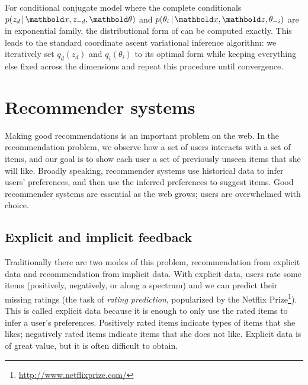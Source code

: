 For conditional conjugate model where the complete conditionals $p(z_d \g \mbx, z_{-d}, \mb\theta)$ and $p(\theta_i \g \mbx, \mbz, \theta_{-i})$ are in exponential family, the distributional form of  can be computed exactly. This leads to the standard coordinate ascent variational inference algorithm: we iteratively set $q_d(z_d)$ and $q_i(\theta_i)$ to its optimal form while keeping everything else fixed across the dimensions and repeat this procedure until convergence. 

\section{Recommender systems}\label{chpt:background:sec:recsys}

Making good recommendations is an important problem on the web. In the
recommendation problem, we observe how a set of users interacts with a
set of items, and our goal is to show each user a set of previously
unseen items that she will like.  Broadly speaking, recommender
systems use historical data to infer users' preferences, and then use
the inferred preferences to suggest items.  Good recommender
systems are essential as the web grows; users are overwhelmed with
choice.

\subsection{Explicit and implicit feedback} \label{chpt:background:sec:data}

Traditionally there are two modes of this problem, recommendation from
explicit data and recommendation from implicit data.  With explicit
data, users rate some items (positively, negatively, or along a
spectrum) and we can predict their missing ratings (the task of \textit{rating prediction}, popularized by the Netflix Prize\footnote{\url{http://www.netflixprize.com/}}). This is called explicit data because it is enough to only use the rated items to infer a user's
preferences. Positively rated items indicate types of items that she
likes; negatively rated items indicate items that she does not like. Explicit data is of great value, but it is often difficult to obtain. 

